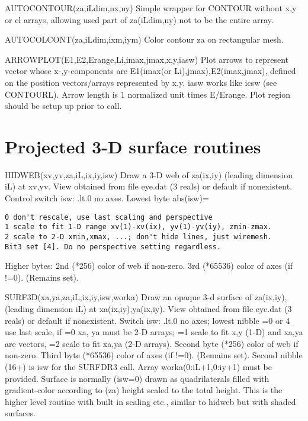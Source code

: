 \documentclass[12pt]{article}
\newif \iftth
\begin{document}
AUTOCONTOUR(za,iLdim,nx,ny) Simple wrapper for CONTOUR without x,y 
or cl arrays, allowing used part of za(iLdim,ny) not to be the entire array.

AUTOCOLCONT(za,iLdim,ixm,iym) Color contour za on rectangular mesh.

ARROWPLOT(E1,E2,Erange,Li,imax,jmax,x,y,iasw) Plot arrows to represent
vector whose x-,y-components are E1(imax(or Li),jmax),E2(imax,jmax),
defined on the position vectors/arrays represented by x,y. iasw works
like icsw (see CONTOURL). Arrow length is 1 normalized unit times
E/Erange. Plot region should be setup up prior to
call.

\section{Projected 3-D surface routines}

\iftth \special{html:<a href="hidtest.f"><img align="right" src="hidtest.png"></a>}\fi

HIDWEB(xv,yv,za,iL,ix,iy,isw) Draw a 3-D web of za(ix,iy) (leading
dimension iL) at xv,yv.  View obtained from file eye.dat (3 reals) or
default if nonexistent. Control switch isw: .lt.0 no axes.
Lowest byte abs(isw)=
\begin{verbatim}
0 don't rescale, use last scaling and perspective
1 scale to fit 1-D range xv(1)-xv(ix), yv(1)-yv(iy), zmin-zmax.
2 scale to 2-D xmin,xmax, ...; don't hide lines, just wiremesh.
Bit3 set [4]. Do no perspective setting regardless.
\end{verbatim}

Higher bytes: {2nd} (*256) color of web if non-zero. {3rd} (*65536) color
of axes (if !=0). (Remains set).

SURF3D(xa,ya,za,iL,ix,iy,isw,worka) Draw an opaque 3-d surface of
za(ix,iy), (leading dimension iL) at xa(ix,iy),ya(ix,iy).  View
obtained from file eye.dat (3 reals) or default if nonexistent. Switch
isw: .lt.0 no axes; lowest nibble =0 or 4 use last scale, if =0 xa, ya
must be 2-D arrays; =1 scale to fit x,y (1-D) and xa,ya are vectors,
=2 scale to fit xa,ya (2-D arrays). Second byte (*256) color of web if
non-zero. Third byte (*65536) color of axes (if !=0). (Remains
set). Second nibble (16+) is isw for the SURFDR3 call. Array
worka(0:iL+1,0:iy+1) must be provided.  Surface is normally (isw=0)
drawn as quadrilaterals filled with gradient-color according to (za)
height scaled to the total height. This is the higher level routine
with built in scaling etc., similar to hidweb but with shaded surfaces.
\end{document}
